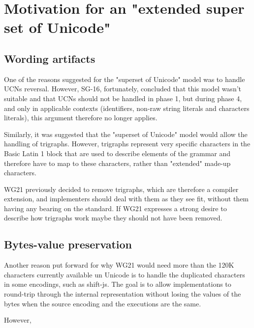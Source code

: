 \documentclass{wg21}
\begin{document}
\section{Motivation for an "extended super set of Unicode"}

\subsection{Wording artifacts}

One of the reasons suggested for the "superset of Unicode" model was to handle UCNs reversal.
However, SG-16, fortunately, concluded that this model wasn't suitable and that UCNs should
not be handled in phase 1, but during phase 4, and only in applicable contexts (identifiers, non-raw string literals and characters literals), 
this argument therefore no longer applies.

Similarly, it was suggested that the "superset of Unicode" model would allow the handling of trigraphs.
However, trigraphs represent very specific characters in the Basic Latin 1 block that are used to describe
elements of the grammar and therefore have to map to these characters, rather than "extended" made-up characters.

WG21 previously decided to remove trigraphs, which are therefore a compiler extension, and implementers should deal with them as they see fit,
without them having any bearing on the standard.
If WG21 expresses a strong desire to describe how trigraphs work maybe they should not have been removed.
  
\subsection{Bytes-value preservation}

Another reason put forward for why WG21 would need more than the 120K characters currently available un Unicode
is to handle the duplicated characters in some encodings, such as shift-js.
The goal is to allow implementations to round-trip through the internal representation without losing the values of the bytes
when the source encoding and the executions are the same.

However,
\end{document}
